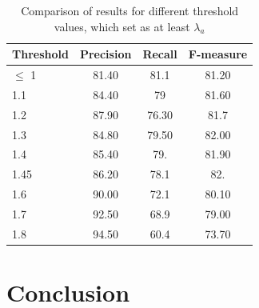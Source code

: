 \documentclass[preprint,review,12pt]{elsarticle}
\begin{document}
\begin{table}[thb]
  \centering
  \begin{tabular}[th]{lccc}
    \hline
    Threshold & Precision & Recall & F-measure \\
    \hline
    $\leq$ 1 & 81.40 & 81.1 & 81.20 \\
    1.1 & 84.40 & 79 & 81.60 \\
    1.2 & 87.90 & 76.30 & 81.7 \\
    1.3 & 84.80 & 79.50 & 82.00 \\
    1.4 & 85.40 & 79. & 81.90 \\
    1.45 & 86.20 & 78.1 & 82. \\
    1.6 & 90.00 & 72.1 & 80.10 \\
    1.7 & 92.50 & 68.9 & 79.00 \\
    1.8 & 94.50 & 60.4 & 73.70 \\
    \hline
  \end{tabular}
  \caption{Comparison of results for different threshold values, which set as at least $\lambda_a$}
\label{tab:thresholds}
\end{table}

\section{Conclusion}







\end{document}
